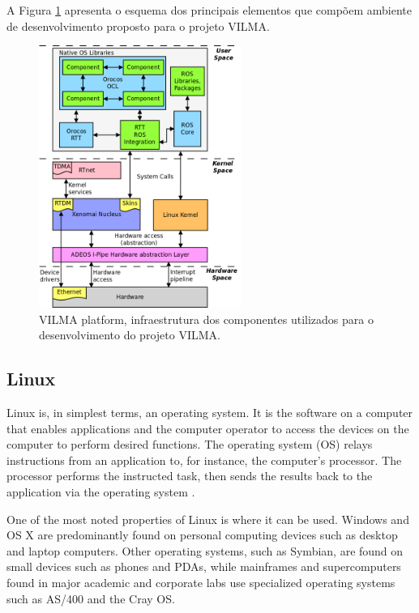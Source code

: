 \documentclass[conference]{IEEEtran}
\begin{document}
A Figura \ref{fig:VILMA_ENV_OVERVIEW_NET} apresenta o esquema dos principais elementos que compõem ambiente de desenvolvimento proposto para o projeto VILMA.

\begin{figure}[h]
	\centering
	\includegraphics[width=250px,keepaspectratio]{imagens/VILMA_ENV_OVERVIEW_NET.png}
	\caption{VILMA platform, infraestrutura dos componentes utilizados para o desenvolvimento do projeto VILMA.}
	\label{fig:VILMA_ENV_OVERVIEW_NET}
\end{figure}

%
\subsection{Linux}\label{subsec:linux}

Linux is, in simplest terms, an operating system. It is the software on a computer that enables applications and the computer operator to access the devices on the computer to perform desired functions. The operating system (OS) relays instructions from an application to, for instance, the computer's processor. The processor performs the instructed task, then sends the results back to the application via the operating system \cite{linux_barabanov1997}.

One of the most noted properties of Linux is where it can be used. Windows and OS X are predominantly found on personal computing devices such as desktop and laptop computers. Other operating systems, such as Symbian, are found on small devices such as phones and PDAs, while mainframes and supercomputers found in major academic and corporate labs use specialized operating systems such as AS/400 and the Cray OS.
\end{document}

